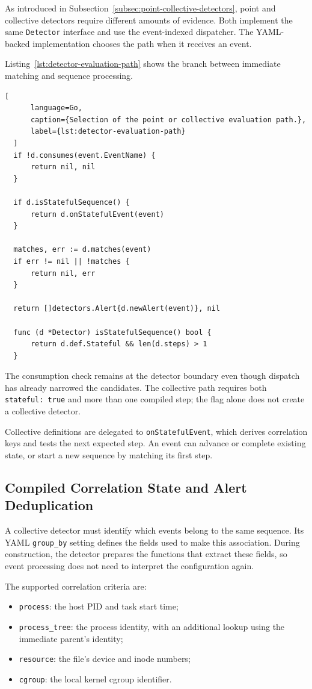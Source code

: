 As introduced in Subsection~\ref{subsec:point-collective-detectors}, point and
collective detectors require different amounts of evidence. Both implement the
same \texttt{Detector} interface and use the event-indexed dispatcher. The
YAML-backed implementation chooses the path when it receives an event.

Listing~\ref{lst:detector-evaluation-path} shows the branch between immediate
matching and sequence processing.

  \begin{lstlisting}[
      language=Go,
      caption={Selection of the point or collective evaluation path.},
      label={lst:detector-evaluation-path}
  ]
  if !d.consumes(event.EventName) {
      return nil, nil
  }

  if d.isStatefulSequence() {
      return d.onStatefulEvent(event)
  }

  matches, err := d.matches(event)
  if err != nil || !matches {
      return nil, err
  }

  return []detectors.Alert{d.newAlert(event)}, nil

  func (d *Detector) isStatefulSequence() bool {
      return d.def.Stateful && len(d.steps) > 1
  }
  \end{lstlisting}

The consumption check remains at the detector boundary even though dispatch has
already narrowed the candidates. The collective path requires both
\texttt{stateful: true} and more than one compiled step; the flag alone does not
create a collective detector.

Collective definitions are delegated to \texttt{onStatefulEvent}, which derives
correlation keys and tests the next expected step. An event can advance or
complete existing state, or start a new sequence by matching its first step.

\subsection{Compiled Correlation State and Alert Deduplication}
\label{subsec:implementation-correlation-deduplication}

A collective detector must identify which events belong to the same
sequence. Its YAML \texttt{group\_by} setting defines the fields used
to make this association. During construction, the detector prepares
the functions that extract these fields, so event processing does not
need to interpret the configuration again.

The supported correlation criteria are:
\begin{itemize}
    \item \texttt{process}: the host PID and task start time;
    \item \texttt{process\_tree}: the process identity, with an additional
    lookup using the immediate parent's identity;
    \item \texttt{resource}: the file's device and inode numbers;
    \item \texttt{cgroup}: the local kernel cgroup identifier.
\end{itemize}


